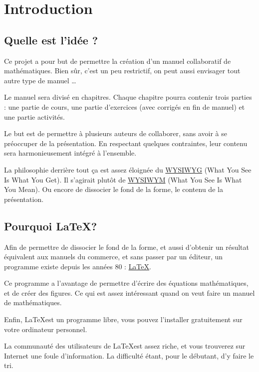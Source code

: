 \chapter{Introduction}

\thispagestyle{chapterpage}

\newpage
\section{Quelle est l'idée ?}

Ce projet a pour but de permettre la création d'un manuel collaboratif de mathématiques. Bien sûr, c'est un peu restrictif, on peut aussi envisager tout autre type de manuel \ldots 

Le manuel sera divisé en chapitres. Chaque chapitre pourra contenir trois parties : une partie de cours, une partie d'exercices (avec corrigés en fin de manuel) et une partie activités.

Le but est de permettre à plusieurs auteurs de collaborer, sans avoir à se préoccuper de la présentation. En respectant quelques contraintes, leur contenu sera harmonieusement intégré à l'ensemble. 

La philosophie derrière tout \c{c}a est assez éloignée du \href{https://fr.wikipedia.org/wiki/What_you_see_is_what_you_get}{WYSIWYG} (What You See Is What You Get). Il s'agirait plutôt de \href{https://fr.wikipedia.org/wiki/What_you_see_is_what_you_mean}{WYSIWYM}  (What You See Is What You Mean). Ou encore de dissocier  le fond  de la forme, le contenu de la présentation. 


\section{Pourquoi \LaTeX ?}

Afin de permettre de dissocier le fond de la forme, et aussi d'obtenir un résultat équivalent aux manuels du commerce, et sans passer par un éditeur, un programme existe depuis les années 80 : \href{https://fr.wikipedia.org/wiki/LaTeX}{\LaTeX}.

Ce programme a l'avantage de permettre d'écrire des équations mathématiques, et de créer des figures. Ce qui est assez intéressant quand on veut faire un manuel de mathématiques.

Enfin, \LaTeX est un programme libre, vous pouvez l'installer gratuitement sur votre ordinateur personnel.

La communauté des utilisateurs de \LaTeX est assez riche, et vous trouverez sur Internet une foule d'information. La difficulté étant,  pour le débutant, d'y faire le tri.

